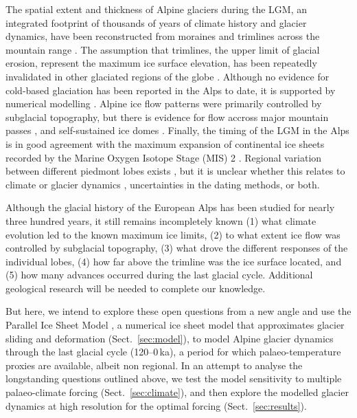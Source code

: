 \documentclass[tc, manuscript]{copernicus}
\begin{document}
    The spatial extent and thickness of Alpine glaciers during the LGM, an
    integrated footprint of thousands of years of climate history and glacier
    dynamics, have been reconstructed from moraines and trimlines across the
    mountain range \citep[e.g.,][]{Penck.Bruckner.1909, Castiglioni.1940,
    Husen.1987, Bini.etal.2009, Coutterand.2010}. The assumption that
    trimlines, the upper limit of glacial
    erosion, represent the maximum ice surface elevation, has
    been repeatedly invalidated in other glaciated regions of the globe
    \citep[e.g.,][]{Kleman.1994, Kleman.etal.2010, Fabel.etal.2012,
    Ballantyne.Stone.2015}. Although
    no evidence for cold-based glaciation has been reported in the Alps to
    date, it is supported by numerical modelling \citep{Blatter.Haeberli.1984,
    Haeberli.Schluchter.1987, Cohen.etal.2017}. Alpine ice flow
    patterns were primarily controlled by subglacial topography, but there is
    evidence for flow accross major mountain passes
    \citep[e.g.,][]{Coutterand.2010, Kelly.etal.2004, Husen.2011}, and
    self-sustained ice domes \citep{Bini.etal.2009}. Finally, the timing of the
    LGM in the Alps \citep{Ivy-Ochs.etal.2008, Monegato.etal.2017} is in good
    agreement with the maximum expansion of continental ice sheets recorded by
    the Marine Oxygen Isotope Stage (MIS) 2
    \citep[29--14\,ka;][]{Lisiecki.Raymo.2005}. Regional variation between
    different piedmont
    lobes exists \citep[Fig.~5]{Wirsig.etal.2016}, but it is unclear whether
    this relates to climate or glacier dynamics \citep{Monegato.etal.2017},
    uncertainties in the dating methods, or both.

    Although the glacial history of the European Alps has been studied for
    nearly three hundred years, it still remains incompletely known
      (1) what climate evolution led to the known maximum ice limits,
      (2) to what extent ice flow was controlled by subglacial topography,
      (3) what drove the different responses of the individual lobes,
      (4) how far above the trimline was the ice surface located, and
      (5) how many advances occurred during the last glacial cycle.
    Additional geological research will be needed to complete our knowledge.

    But here, we intend to explore these open questions from a new angle and
    use the Parallel Ice Sheet Model
    \citep[PISM,][]{PISM-authors.2017}, a numerical ice sheet model that
    approximates glacier sliding and deformation (Sect.~\ref{sec:model}), to
    model Alpine glacier dynamics through the last glacial cycle (120--0\,ka),
    a period for which palaeo-temperature proxies are available, albeit non
    regional. In an attempt to analyse the longstanding questions outlined
    above, we test the model sensitivity to multiple palaeo-climate forcing
    (Sect.~\ref{sec:climate}), and then explore the modelled glacier dynamics
    at high resolution for the optimal forcing (Sect.~\ref{sec:results}).
\end{document}
